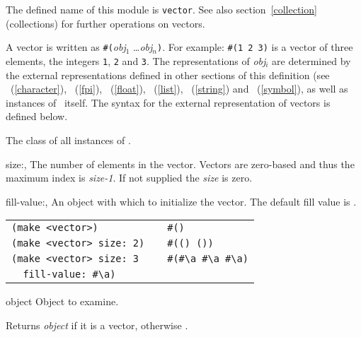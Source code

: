 %
\begin{optDefinition}
The defined name of this module is {\tt vector}.  See also
section~\ref{collection} (collections) for further operations on
vectors.

%
A vector is written as
\verb+#(+{\em obj}$_1$ \ldots {\em obj}$_n$\verb+)+.  For example:
\verb+#(1 2 3)+ is a vector of three elements, the integers {\tt 1}, {\tt 2} and
{\tt 3}.  The representations of {\em obj$_i$} are determined by the external
representations defined in other sections of this definition (see
\ (\ref{character}), \
(\ref{fpi}), \ (\ref{float}), \ (\ref{list}),
\classref{string}\ (\ref{string}) and \classref{symbol}\ (\ref{symbol}), as well
as instances of \classref{vector}\ itself.  The syntax for the external
representation of vectors is defined below.
%
\Syntax
\label{vector-syntax}
%

%
The class of all instances of .
%
\begin{initoptions}
    \item[size:, \classref{int}] The number of elements in
    the vector.  Vectors are zero-based and thus the maximum index is {\em
        size-1}.  If not supplied the {\em size\/} is zero.

    \item[fill-value:, \classref{object}] An object with which to initialize the
    vector.  The default fill value is \nil{}.
\end{initoptions}
%
\examples
\begin{tabular}{lcl}
    \verb|(make <vector>)| &\Ra& \verb|#()|\\
    \verb|(make <vector> size: 2)| &\Ra& \verb|#(() ())|\\
    \verb|(make <vector> size: 3| &\Ra& \verb|#(#\a #\a #\a)|\\
    \verb|  fill-value: #\a)|&&\\
\end{tabular}

%
\begin{arguments}
    \item[object] Object to examine.
\end{arguments}
%
\result%
Returns {\em object\/} if it is a vector, otherwise \nil{}.


\end{optDefinition}
